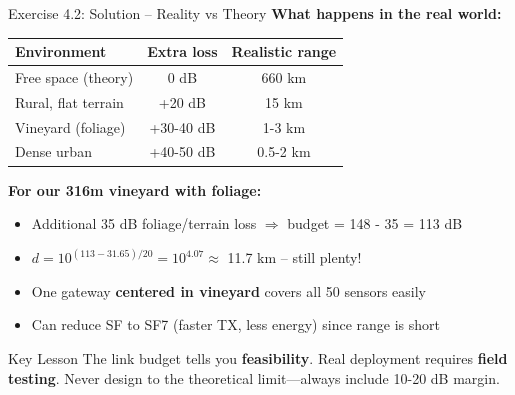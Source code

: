 \documentclass[aspectratio=169,11pt]{beamer}
\begin{document}
\begin{frame}{Exercise 4.2: Solution -- Reality vs Theory}
    \textbf{What happens in the real world:}
    
    \begin{center}
    \begin{tabular}{lcc}
        \toprule
        \textbf{Environment} & \textbf{Extra loss} & \textbf{Realistic range} \\
        \midrule
        Free space (theory) & 0 dB & 660 km \\
        Rural, flat terrain & +20 dB & 15 km \\
        Vineyard (foliage) & +30-40 dB & 1-3 km \\
        Dense urban & +40-50 dB & 0.5-2 km \\
        \bottomrule
    \end{tabular}
    \end{center}
    
    \vspace{0.2cm}
    \textbf{For our 316m vineyard with foliage:}
    \begin{itemize}
        \item Additional 35 dB foliage/terrain loss $\Rightarrow$ budget = 148 - 35 = 113 dB
        \item $d = 10^{(113-31.65)/20} = 10^{4.07} \approx$ 11.7 km -- still plenty!
        \item One gateway \textbf{centered in vineyard} covers all 50 sensors easily
        \item Can reduce SF to SF7 (faster TX, less energy) since range is short
    \end{itemize}
    
    \begin{exampleblock}{Key Lesson}
        The link budget tells you \textbf{feasibility}. Real deployment requires \textbf{field testing}. Never design to the theoretical limit---always include 10-20 dB margin.
    \end{exampleblock}
\end{frame}
\end{document}
